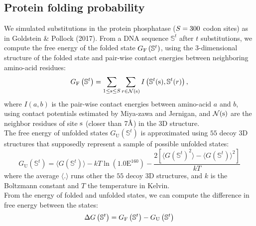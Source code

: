 \subsection{Protein folding probability}
We simulated \glspl{substitution} in the protein phosphatase ($S=300$ \gls{codon} sites) as in Goldstein \& Pollock (2017).
From a \acrshort{DNA} sequence $\mathbb{S}^t$ after $t$ \glspl{substitution}, we compute the free energy of the folded state $G_{\mathrm{F}}\left(\mathbb{S}^{t}\right)$, using the $3$-dimensional structure of the folded state and pair-wise contact energies between neighboring amino-acid residues:
\begin{equation}
    G_{\mathrm{F}}\left(\mathbb{S}^{t}\right) = \sum\limits_{1 \leq \text{s} \leq S} \sum\limits_{r \in \mathcal{N}(\text{s})} I \left(\mathbb{S}^t(\text{s}), \mathbb{S}^t(r) \right),
\end{equation}
where $I(a,b)$ is the pair-wise contact energies between amino-acid $a$ and $b$, using contact potentials estimated by Miya-zawa and Jernigan, and $\mathcal{N}(\text{s})$ are the neighbor residues of site $\text{s}$ (closer than $7\text{\normalfont\AA}$) in the $3$D structure.\\

The free energy of unfolded states $G_{\mathrm{U}}\left(\mathbb{S}^{t}\right)$ is approximated using $55$ decoy $3$D structures that supposedly represent a sample of possible unfolded states:
\begin{equation}
    G_{\mathrm{U}}\left(\mathbb{S}^{t}\right) = \langle G\left(\mathbb{S}^{t}\right) \rangle - kT \ln (1.0\mathrm{E}^{160}) - \dfrac{2 \left[ \langle G\left(\mathbb{S}^{t}\right)^2 \rangle - \langle G\left(\mathbb{S}^{t}\right) \rangle^2\right] }{kT}
\end{equation}
where the average $\langle . \rangle$ runs other the $55$ decoy $3$D structures, and $k$ is the Boltzmann constant and $T$ the temperature in Kelvin.\\

From the energy of folded and unfolded states, we can compute the difference in free energy between the states:
\begin{equation}
    \Delta G\left(\mathbb{S}^{t}\right) = G_{\mathrm{F}}\left(\mathbb{S}^{t}\right) - G_{\mathrm{U}}\left(\mathbb{S}^{t}\right)
\end{equation}

